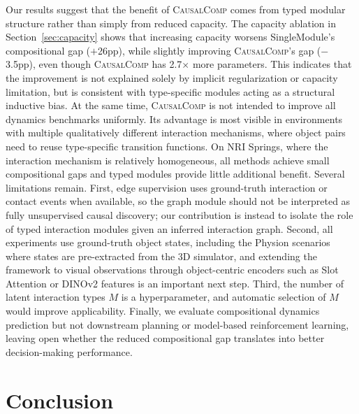 \documentclass{article}
\newcommand{\ours}{\textsc{CausalComp}}
\begin{document}
Our results suggest that the benefit of \ours{} comes from typed modular structure rather than simply from reduced capacity. The capacity ablation in Section~\ref{sec:capacity} shows that increasing capacity worsens SingleModule's compositional gap ($+$26pp), while slightly improving \ours{}'s gap ($-$3.5pp), even though \ours{} has 2.7$\times$ more parameters. This indicates that the improvement is not explained solely by implicit regularization or capacity limitation, but is consistent with type-specific modules acting as a structural inductive bias. At the same time, \ours{} is not intended to improve all dynamics benchmarks uniformly. Its advantage is most visible in environments with multiple qualitatively different interaction mechanisms, where object pairs need to reuse type-specific transition functions. On NRI Springs, where the interaction mechanism is relatively homogeneous, all methods achieve small compositional gaps and typed modules provide little additional benefit. Several limitations remain. First, edge supervision uses ground-truth interaction or contact events when available, so the graph module should not be interpreted as fully unsupervised causal discovery; our contribution is instead to isolate the role of typed interaction modules given an inferred interaction graph. Second, all experiments use ground-truth object states, including the Physion scenarios where states are pre-extracted from the 3D simulator, and extending the framework to visual observations through object-centric encoders such as Slot Attention or DINOv2 features is an important next step. Third, the number of latent interaction types $M$ is a hyperparameter, and automatic selection of $M$ would improve applicability. Finally, we evaluate compositional dynamics prediction but not downstream planning or model-based reinforcement learning, leaving open whether the reduced compositional gap translates into better decision-making performance.

\section{Conclusion}
\end{document}
